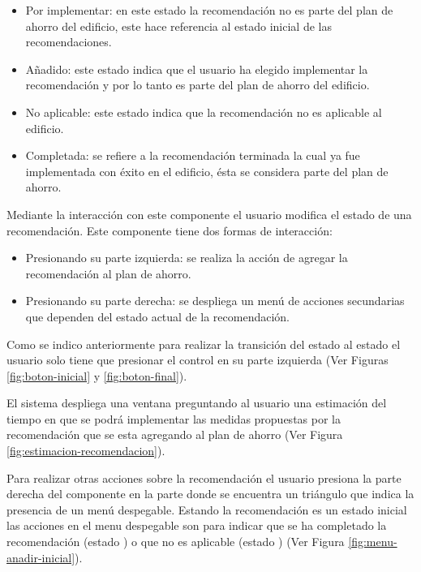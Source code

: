 \begin{itemize}
\item Por implementar: en este estado la recomendación no es parte
  del plan de ahorro del edificio, este hace referencia al estado inicial de
  las recomendaciones.
\item Añadido: este estado indica que el usuario ha elegido implementar la
  recomendación y por lo tanto es parte del plan de ahorro del edificio.
\item No aplicable: este estado indica que la recomendación no es aplicable al
  edificio.
\item Completada: se refiere a la recomendación terminada la cual ya fue implementada
  con éxito en el edificio, ésta se considera parte del plan de ahorro.
\end{itemize}

Mediante la interacción con este componente el usuario modifica el estado
de una recomendación. Este componente tiene dos formas de interacción:
\begin{itemize}
\item Presionando su parte izquierda: se realiza la acción de agregar la
  recomendación al plan de ahorro.
\item Presionando su parte derecha: se despliega un menú de acciones
  secundarias que dependen del estado actual de la recomendación.
\end{itemize}

Como se indico anteriormente para realizar la transición del estado
 al estado  el usuario solo tiene
que presionar el control en su parte izquierda (Ver Figuras \ref{fig:boton-inicial}
y \ref{fig:boton-final}).

El sistema despliega una ventana preguntando al usuario una estimación
del tiempo en que se podrá implementar las medidas propuestas por la
recomendación que se esta agregando al plan de ahorro (Ver Figura \ref{fig:estimacion-recomendacion}).

Para realizar otras acciones sobre la recomendación el usuario presiona la parte
derecha del componente en la parte donde se encuentra un triángulo que indica la
presencia de un menú despegable.
Estando la recomendación es un estado inicial  las
acciones en el menu despegable son para indicar que se ha completado la recomendación
(estado ) o que no es aplicable
(estado ) (Ver Figura \ref{fig:menu-anadir-inicial}).

